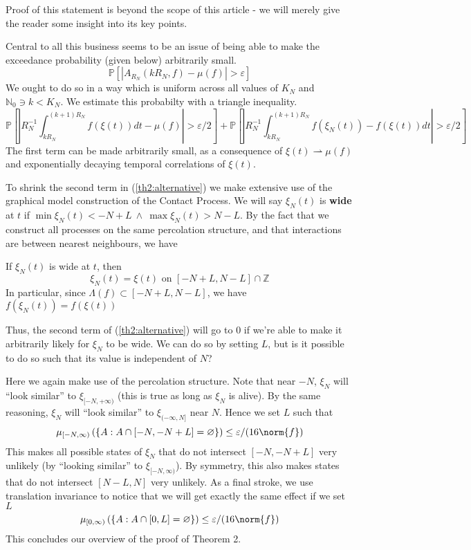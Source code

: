 \documentclass{scrartcl}
\begin{document}
Proof of this statement is beyond the scope of this article - we will merely give the reader some insight into its key points.

Central to all this business seems to be an issue of being able to make the exceedance probability (given below) arbitrarily small.
\[
    \mathbb{P}\left[ |A_{R_N}(kR_N, f) - \mu(f)| > \varepsilon\right]
\]
We ought to do so in a way which is uniform across all values of $K_N$ and $\mathbb{N}_0 \ni k < K_N$. We estimate this probabilty with a triangle inequality.
\footnotesize
\begin{equation}
    \mathbb{P}\left[ \left|R_N^{-1}\int_{kR_N}^{(k+1)R_N}f(\xi(t))dt - \mu(f)\right| > \varepsilon/2 \right] + 
    \mathbb{P}\left[ \left|R_N^{-1}\int_{kR_N}^{(k+1)R_N}f(\xi_N(t)) - f(\xi(t))dt \right| > \varepsilon/2\right]
    \label{th2:alternative}
\end{equation}
\normalsize
The first term can be made arbitrarily small, as a consequence of $\xi(t) \rightharpoonup \mu(f)$ and exponentially decaying temporal correlations of $\xi(t)$.

To shrink the second term in (\ref{th2:alternative}) we make extensive use of the graphical model construction of the Contact Process. We will say $\xi_N(t)$ is \textbf{wide} at $t$ if $\min\xi_N(t) < -N + L\ \land\ \max\xi_N(t) > N - L$.
By the fact that we construct all processes on the same percolation structure, and that interactions are between nearest neighbours, we have
\begin{lemma}
    If $\xi_N(t)$ is wide at $t$, then \[\xi_N(t) = \xi(t)\text{ on }[-N + L, N - L] \cap \mathbb{Z}\]
    In particular, since $\Lambda(f) \subset [-N+L, N-L]$, we have $f(\xi_N(t)) = f(\xi(t))$
\end{lemma}
Thus, the second term of (\ref{th2:alternative}) will go to 0 if we're able to make it arbitrarily likely for $\xi_N$ to be wide. We can do so by setting $L$, but is it possible to do so such that its value is 
independent of $N$? 

Here we again make use of the percolation structure. Note that near $-N$, $\xi_N$ will ``look similar'' to $\xi_{[-N, +\infty)}$ (this is true as long as $\xi_N$ is alive). By the same reasoning, $\xi_N$ will ``look similar'' to $\xi_{(-\infty, N]}$ near $N$.
Hence we set $L$ such that
    \[
        \mu_{[-N, \infty)}\left( \left\{ A : A \cap [-N,-N+L] = \varnothing \right\} \right)  \leq \varepsilon/(16\norm{f})
    \]
This makes all possible states of $\xi_N$ that do not intersect $[-N, -N+L]$ very unlikely (by ``looking similar'' to $\xi_{[-N, \infty)}$). By symmetry, this also makes states
that do not intersect $[N-L, N]$ very unlikely. As a final stroke, we use translation invariance to notice that we will get exactly the same effect if we set $L$ 
    \[
        \mu_{[0, \infty)}\left( \left\{ A : A \cap [0,L] = \varnothing \right\} \right) \leq \varepsilon/(16\norm{f})
    \]
This concludes our overview of the proof of Theorem 2.
        
\end{document}
